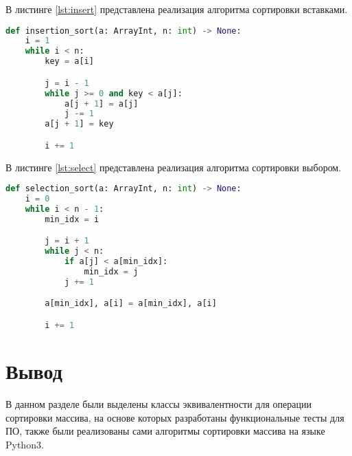 В листинге \ref{lst:insert} представлена реализация алгоритма сортировки вставками.
\begin{lstlisting}[style=mypython,label=lst:insert,caption={Реализация алгоритма сортировки вставками},language=python]
def insertion_sort(a: ArrayInt, n: int) -> None:
    i = 1
    while i < n:
        key = a[i]

        j = i - 1
        while j >= 0 and key < a[j]:
            a[j + 1] = a[j]
            j -= 1
        a[j + 1] = key

        i += 1
\end{lstlisting}

В листинге \ref{lst:select} представлена реализация алгоритма сортировки выбором.
\begin{lstlisting}[style=mypython,label=lst:select,caption={Реализация алгоритма сортировки выбором},language=python]
def selection_sort(a: ArrayInt, n: int) -> None:
    i = 0
    while i < n - 1:
        min_idx = i

        j = i + 1
        while j < n:
            if a[j] < a[min_idx]:
                min_idx = j
            j += 1

        a[min_idx], a[i] = a[min_idx], a[i]

        i += 1
\end{lstlisting}


\section{Вывод}
В данном разделе были выделены классы эквивалентности для операции сортировки массива, 
на основе которых разработаны функциональные тесты для ПО, также были реализованы сами алгоритмы 
сортировки массива на языке Python3.